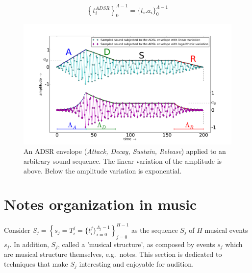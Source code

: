 \documentclass[
 aip,
 jmp,
 amsmath,amssymb,
 reprint,
]{revtex4-1}
\begin{document}
\begin{equation}\label{eq:adsrApl}
\left\{t_i^{ADSR}\right\}_0^{\Lambda-1} =\{t_i . a_i\}_0^{\Lambda-1}
\end{equation}

\begin{figure}[htpq!]
    \centering
        \includegraphics[width=\columnwidth]{figures/adsr}
    \caption{An ADSR envelope (\emph{Attack, Decay, Sustain, Release}) applied
        to an arbitrary sound sequence. The linear variation of the amplitude is
        above. Below the amplitude variation is exponential.}
        \label{fig:adsr}
\end{figure}





\section{Notes organization in music}\label{notasMusica} \label{sec:notesMusic}

Consider $ S_j=\left\{  s_j=T_i^j=\{t_i^j\}_{i=0}^{\Lambda_j-1} \right\}_{j=0}^{H-1} $ as the sequence $S_j$ of $H$ musical events $s_j$. In addition, $S_j$, called a 'musical structure', as composed by events $s_j$ which are musical structure themselves, e.g.\ notes. This section is dedicated to techniques that make $S_j$ interesting and enjoyable for audition.
\end{document}
